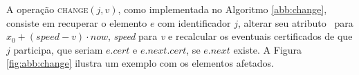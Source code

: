 






A operação \textsc{change}$(j, v)$, como implementada no Algoritmo
\ref{abb:change}, consiste em recuperar o elemento $e$ com
identificador $j$, alterar seu atributo \initv~para $x_0 +
(\mathit{speed} - v)\cdot now$, \textit{speed} para \textit{v} e
recalcular os eventuais certificados de que $j$ participa, que
seriam $e.cert$ e $e.next.cert$, se $e.next$ existe. A Figura
\ref{fig:abb:change} ilustra um exemplo com os elementos afetados.







